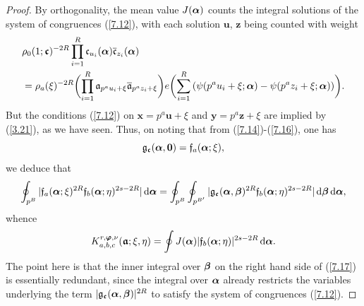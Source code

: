 \documentclass[12pt,reqno]{amsart}
\theoremstyle{definition}
\theoremstyle{remark}
\numberwithin{equation}{section}
\def\bfu{{\mathbf u}}
\def\bfx{{\mathbf x}}
\def\bfy{{\mathbf y}}
\def\bfz{{\mathbf z}}
\def\gra{{\mathfrak a}}\def\grA{{\mathfrak A}}\def\bfgra{{\boldsymbol \gra}}
\def\grc{{\mathfrak c}}\def\grC{{\mathfrak C}}\def\bfgrc{{\boldsymbol \grc}}
\def\grf{{\mathfrak f}}\def\grF{{\mathfrak F}}
\def\grg{{\mathfrak g}}\def\grG{{\mathfrak G}}
\def\d{{\,{\rm d}}}
\begin{document}
\begin{proof}
\par By orthogonality, the mean value $J({\boldsymbol \alpha})$ counts the integral solutions of the 
system of congruences (\ref{7.12}), with each solution $\bfu$, $\bfz$ being counted with 
weight
\begin{align*}
&\rho_0(1;\bfgrc)^{-2R}\prod_{i=1}^R\grc_{u_i}(\bfalp){\overline \grc_{z_i}(\bfalp)}\\
&=\rho_a(\xi)^{-2R}\biggl( \prod_{i=1}^R\gra_{p^au_i+\xi}{\overline \gra_{p^az_i+\xi}}
\biggr) e\biggl( \sum_{i=1}^R \left( \psi(p^au_i+\xi;\bfalp)-\psi(p^az_i+\xi;\bfalp )
\right)\biggr) .
\end{align*}
But the conditions (\ref{7.12}) on $\bfx=p^a\bfu+\xi$ and $\bfy=p^a\bfz+\xi$ are implied 
by (\ref{3.21}), as we have seen. Thus, on noting that from (\ref{7.14})-(\ref{7.16}), one 
has
$$\grg_\bfgrc(\bfalp,{\mathbf 0})=\grf_a(\bfalp;\xi),$$
we deduce that
\begin{equation}\label{7.17}
\oint_{p^B}|\grf_a(\bfalp;\xi)^{2R}\grf_b(\bfalp;\eta)^{2s-2R}|\d\bfalp=
\oint_{p^B}\oint_{p^{B^\prime}}|\grg_\bfgrc(\bfalp,\bfbet)^{2R}
\grf_b(\bfalp;\eta)^{2s-2R}|\d\bfbet \d\bfalp,
\end{equation}
whence
\begin{equation}\label{7.18}
K_{a,b,c}^{r,\bfvarphi,\nu}(\bfgra;\xi,\eta)=
\oint J(\bfalp)|\grf_b(\bfalp;\eta)|^{2s-2R}\d\bfalp .
\end{equation}
The point here is that the inner integral over ${\boldsymbol \beta}$ on the right hand side of (\ref{7.17}) 
is essentially redundant, since the integral over ${\boldsymbol \alpha}$ already restricts the variables 
underlying the term $|\grg_\bfgrc(\bfalp,\bfbet)|^{2R}$ to satisfy the system of 
congruences (\ref{7.12}).\par


\end{proof}
\end{document}
